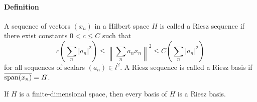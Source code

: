 \documentclass[12pt]{article}
\begin{document}
\paragraph{Definition}
A sequence of vectors $(x_n)$ in a Hilbert space $H$ is called a Riesz sequence if there exist constants $0 < c \leq C$ such that 
$$ c\left( \sum_n |a_n|^2 \right) \leq \left\| \sum_n a_n x_n \right\|^2 \leq C \left( \sum_n |a_n|^2 \right) $$
for all sequences of scalars $(a_n) \in l^2$. A Riesz sequence is called a Riesz basis if $\overline{\mathop{\rm span} (x_n)} = H$.

If $H$ is a finite-dimensional space, then every basis of $H$ is a Riesz basis.
\end{document}
